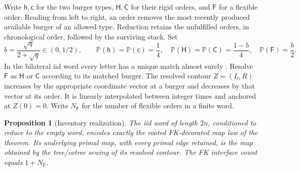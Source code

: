 \documentclass[11pt]{article}
\numberwithin{equation}{section}
\newtheorem{proposition}[theorem]{Proposition}
\theoremstyle{definition}
\theoremstyle{remark}
\newcommand{\PP}{\mathbb P}
\newcommand{\1}{\mathbf 1}
\begin{document}
Write $\mathsf h,\mathsf c$ for the two burger types,
$\mathsf H,\mathsf C$ for their rigid orders, and $\mathsf F$ for a flexible
order.  Reading from left to right, an order removes the most recently
produced available burger of an allowed type.  Reduction retains the
unfulfilled orders, in chronological order, followed by the surviving stack.
Set
\begin{equation}\label{enc:letter-law}
 b=\frac{\sqrt q}{2+\sqrt q}\in(0,1/2),\qquad
 \PP(\mathsf h)=\PP(\mathsf c)=\frac14,\quad
 \PP(\mathsf H)=\PP(\mathsf C)=\frac{1-b}{4},\quad
 \PP(\mathsf F)=\frac b2.
\end{equation}
In the bilateral iid word every letter has a unique match almost surely
\cite[Proposition 2.2]{SheffieldInventory}.  Resolve $\mathsf F$ as
$\mathsf H$ or $\mathsf C$ according to its matched burger.  The resolved
contour $Z=(L,R)$ increases by the appropriate coordinate vector at a burger
and decreases by that vector at its order.  It is linearly interpolated
between integer times and anchored at $Z(0)=0$.  Write $N_{\mathsf F}$
for the number of flexible orders in a finite word.

\begin{proposition}[Inventory realization]\label{enc:inventory-law}
The iid word of length $2n$, conditioned to reduce to the empty word,
encodes exactly the rooted FK-decorated map law of the theorem.  Its
underlying primal map, with every primal edge retained, is the map obtained
by the tree/cotree sewing of its resolved contour.  The FK interface count
equals $1+N_{\mathsf F}$.
\end{proposition}
\end{document}
